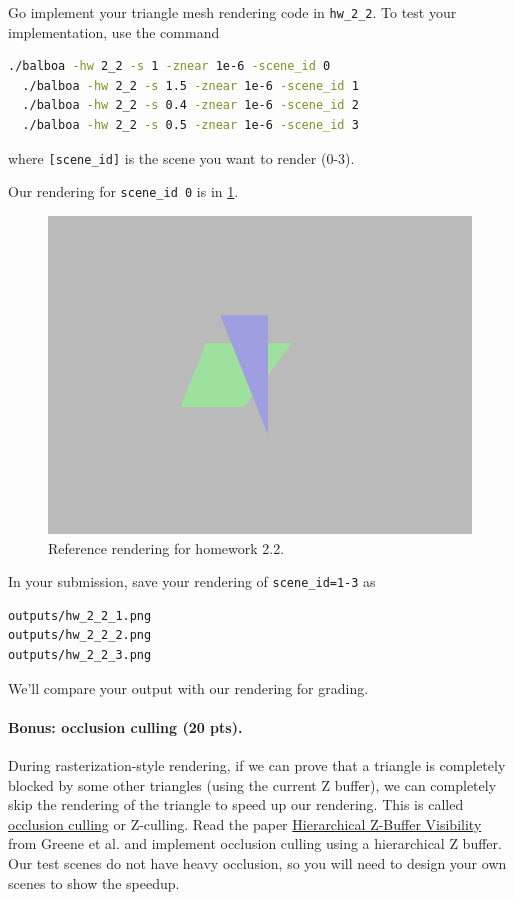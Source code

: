 Go implement your triangle mesh rendering code in \lstinline{hw_2_2}. To test your implementation, use the command
\begin{lstlisting}[language=bash]
  ./balboa -hw 2_2 -s 1 -znear 1e-6 -scene_id 0
  ./balboa -hw 2_2 -s 1.5 -znear 1e-6 -scene_id 1
  ./balboa -hw 2_2 -s 0.4 -znear 1e-6 -scene_id 2
  ./balboa -hw 2_2 -s 0.5 -znear 1e-6 -scene_id 3
\end{lstlisting}
where \lstinline{[scene_id]} is the scene you want to render (0-3).

Our rendering for \lstinline{scene_id 0} is in \cref{fig:hw2_2}.
\begin{figure}[h]
    \centering
    \includegraphics[width=0.5\linewidth]{imgs/hw_2_2.png}
    \caption{Reference rendering for homework 2.2.}
    \label{fig:hw2_2}
\end{figure}

In your submission, save your rendering of \lstinline{scene_id=1-3} as
\begin{lstlisting}[language=bash]
outputs/hw_2_2_1.png
outputs/hw_2_2_2.png
outputs/hw_2_2_3.png
\end{lstlisting}
We'll compare your output with our rendering for grading.

\paragraph{Bonus: occlusion culling (20 pts).} During rasterization-style rendering, if we can prove that a triangle is completely blocked by some other triangles (using the current Z buffer), we can completely skip the rendering of the triangle to speed up our rendering. This is called \href{https://en.wikipedia.org/wiki/Z-buffering#Z-culling}{occlusion culling} or Z-culling. Read the paper \href{https://dl.acm.org/doi/10.1145/166117.166147}{Hierarchical Z-Buffer Visibility} from Greene et al. and implement occlusion culling using a hierarchical Z buffer. Our test scenes do not have heavy occlusion, so you will need to design your own scenes to show the speedup.

